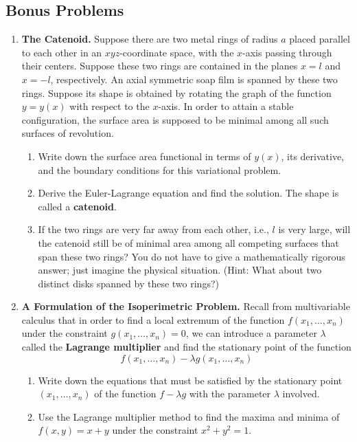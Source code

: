 \documentclass[../psets.tex]{subfiles}
\begin{document}
\subsection*{Bonus Problems}
\begin{enumerate}
    \item \textbf{The Catenoid.} Suppose there are two metal rings of radius $a$ placed parallel to each other in an $xyz$-coordinate space, with the $x$-axis passing through their centers. Suppose these two rings are contained in the planes $x=l$ and $x=-l$, respectively. An axial symmetric soap film is spanned by these two rings. Suppose its shape is obtained by rotating the graph of the function $y=y(x)$ with respect to the $x$-axis. In order to attain a stable configuration, the surface area is supposed to be minimal among all such surfaces of revolution.
    \begin{enumerate}
        \item Write down the surface area functional in terms of $y(x)$, its derivative, and the boundary conditions for this variational problem.
        \item Derive the Euler-Lagrange equation and find the solution. The shape is called a \textbf{catenoid}.
        \item If the two rings are very far away from each other, i.e., $l$ is very large, will the catenoid still be of minimal area among all competing surfaces that span these two rings? You do not have to give a mathematically rigorous answer; just imagine the physical situation. (Hint: What about two distinct disks spanned by these two rings?)
    \end{enumerate}
    \item \textbf{A Formulation of the Isoperimetric Problem.} Recall from multivariable calculus that in order to find a local extremum of the function $f(x_1,\dots,x_n)$ under the constraint $g(x_1,\dots,x_n)=0$, we can introduce a parameter $\lambda$ called the \textbf{Lagrange multiplier} and find the stationary point of the function
    \begin{equation*}
        f(x_1,\dots,x_n)-\lambda g(x_1,\dots,x_n)
    \end{equation*}
    \begin{enumerate}
        \item Write down the equations that must be satisfied by the stationary point $(x_1,\dots,x_n)$ of the function $f-\lambda g$ with the parameter $\lambda$ involved.
        \item Use the Lagrange multiplier method to find the maxima and minima of $f(x,y)=x+y$ under the constraint $x^2+y^2=1$.

\end{enumerate}
\end{enumerate}
\end{document}
